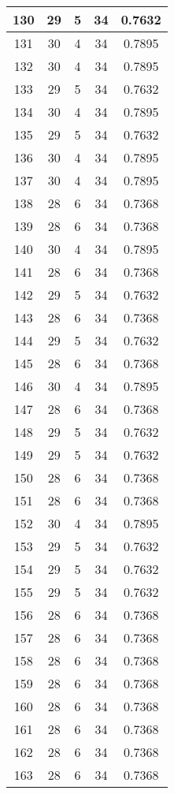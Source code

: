 \documentclass[letterpaper, 12pt]{article}
\begin{document}
\begin{longtable}{|c|c|c|c|c|}
\hline
130 & 29 & 5 & 34 & 0.7632 \\
\hline
131 & 30 & 4 & 34 & 0.7895 \\
\hline
132 & 30 & 4 & 34 & 0.7895 \\
\hline
133 & 29 & 5 & 34 & 0.7632 \\
\hline
134 & 30 & 4 & 34 & 0.7895 \\
\hline
135 & 29 & 5 & 34 & 0.7632 \\
\hline
136 & 30 & 4 & 34 & 0.7895 \\
\hline
137 & 30 & 4 & 34 & 0.7895 \\
\hline
138 & 28 & 6 & 34 & 0.7368 \\
\hline
139 & 28 & 6 & 34 & 0.7368 \\
\hline
140 & 30 & 4 & 34 & 0.7895 \\
\hline
141 & 28 & 6 & 34 & 0.7368 \\
\hline
142 & 29 & 5 & 34 & 0.7632 \\
\hline
143 & 28 & 6 & 34 & 0.7368 \\
\hline
144 & 29 & 5 & 34 & 0.7632 \\
\hline
145 & 28 & 6 & 34 & 0.7368 \\
\hline
146 & 30 & 4 & 34 & 0.7895 \\
\hline
147 & 28 & 6 & 34 & 0.7368 \\
\hline
148 & 29 & 5 & 34 & 0.7632 \\
\hline
149 & 29 & 5 & 34 & 0.7632 \\
\hline
150 & 28 & 6 & 34 & 0.7368 \\
\hline
151 & 28 & 6 & 34 & 0.7368 \\
\hline
152 & 30 & 4 & 34 & 0.7895 \\
\hline
153 & 29 & 5 & 34 & 0.7632 \\
\hline
154 & 29 & 5 & 34 & 0.7632 \\
\hline
155 & 29 & 5 & 34 & 0.7632 \\
\hline
156 & 28 & 6 & 34 & 0.7368 \\
\hline
157 & 28 & 6 & 34 & 0.7368 \\
\hline
158 & 28 & 6 & 34 & 0.7368 \\
\hline
159 & 28 & 6 & 34 & 0.7368 \\
\hline
160 & 28 & 6 & 34 & 0.7368 \\
\hline
161 & 28 & 6 & 34 & 0.7368 \\
\hline
162 & 28 & 6 & 34 & 0.7368 \\
\hline
163 & 28 & 6 & 34 & 0.7368 \\

\end{longtable}
\end{document}
